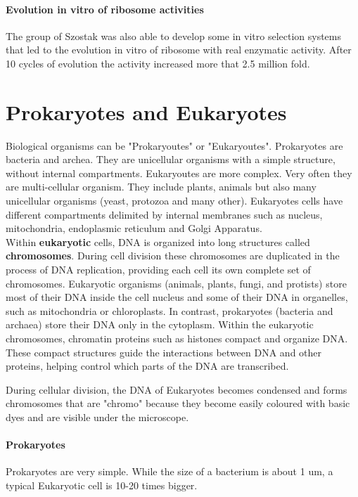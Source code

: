 \paragraph*{Evolution in vitro of ribosome activities}
The group of Szostak was also able to develop some in vitro selection systems
that led to the evolution in vitro of ribosome with real enzymatic activity.
After 10 cycles of evolution the activity increased more that 2.5 million fold.

\section{Prokaryotes and Eukaryotes}

Biological organisms can be "Prokaryoutes" or "Eukaryoutes". Prokaryotes are
bacteria and archea. They are unicellular organisms with a simple structure,
without internal compartments. Eukaryoutes are more complex. Very often they are
multi-cellular organism. They include plants, animals but also many unicellular
organisms (yeast, protozoa and many other). Eukaryotes cells have different
compartments delimited by internal membranes such as nucleus, mitochondria,
endoplasmic reticulum and Golgi Apparatus.\\

Within \textbf{eukaryotic} cells, DNA is organized into long structures called 
\textbf{chromosomes}. 
During cell division these chromosomes are duplicated in the process of DNA 
replication, providing each cell its own complete set of chromosomes. 
Eukaryotic organisms (animals, plants, fungi, and protists) store most of 
their DNA inside the cell nucleus and some of their DNA in organelles, such as 
mitochondria or chloroplasts.
In contrast, prokaryotes (bacteria and archaea) store their DNA only in the 
cytoplasm. 
Within the eukaryotic chromosomes, chromatin proteins such as histones compact 
and organize DNA. 
These compact structures guide the interactions between DNA and other proteins, 
helping control which parts of the DNA are transcribed.

During cellular division, the DNA
of Eukaryotes becomes condensed and forms chromosomes that are "chromo" because
they become easily coloured with basic dyes and are visible under the
microscope.

\paragraph*{Prokaryotes} Prokaryotes are very simple. While the size of a
bacterium is about 1 um, a typical Eukaryotic cell is 10-20 times bigger.

